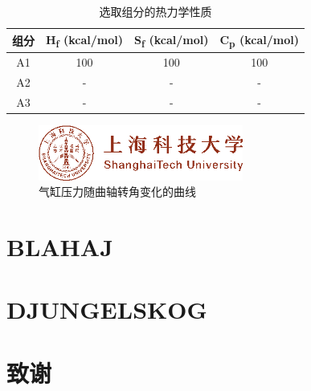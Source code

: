 \documentclass{ctexart}
\begin{document}
\begin{mainmatter}
		
		\begin{table}[htbp]
			\centering
			\caption{选取组分的热力学性质}
			\label{tab:thermo}
			\begin{tabular}{cccc}
				\toprule
				组分 & H\textsubscript{f} (kcal/mol) & S\textsubscript{f} (kcal/mol) & C\textsubscript{p} (kcal/mol) \\
				\midrule
				A1 & 100 & 100 & 100 \\
				A2 & - & - & - \\
				A3 & - & - & - \\
				\bottomrule
			\end{tabular}
		\end{table}
		
		\begin{figure}[htbp]
			\centering
			\includegraphics[width=0.6\textwidth]{image/logo.png}
			\caption{气缸压力随曲轴转角变化的曲线}
			\label{fig:pressure}
		\end{figure}
		
		\section{BLAHAJ}
		
		\section{DJUNGELSKOG}
	\end{mainmatter}
	
	
	\begin{backmatter}
		\begin{thebibliography}{99}
			
		\end{thebibliography}
		
		\section*{致谢}
		
	\end{backmatter}
	
\end{document}
